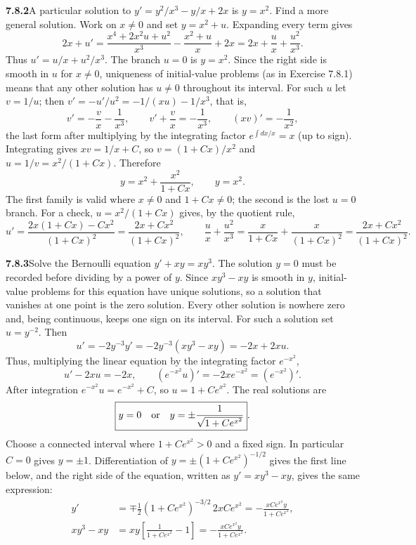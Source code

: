 \par\bigskip
\noindent\textbf{7.8.2}\quad A particular solution to
$y'=y^{2}/x^{3}-y/x+2x$ is $y=x^{2}$. Find a more general solution.
\solution
Work on $x\ne0$ and set $y=x^2+u$. Expanding every term gives
\[
2x+u'=\frac{x^4+2x^2u+u^2}{x^3}
          -\frac{x^2+u}{x}+2x
=2x+\frac ux+\frac{u^2}{x^3}.
\]
Thus $u'=u/x+u^2/x^3$. The branch $u=0$ is $y=x^2$. Since the right
side is smooth in $u$ for $x\ne0$, uniqueness of initial-value problems
(as in Exercise 7.8.1) means that any other solution has $u\ne0$
throughout its interval. For such $u$ let $v=1/u$; then
$v'=-u'/u^2=-1/(xu)-1/x^3$, that is,
\[
v'=-\frac vx-\frac1{x^3},\qquad
v'+\frac vx=-\frac1{x^3},\qquad (xv)'=-\frac1{x^2},
\]
the last form after multiplying by the integrating factor
$e^{\int dx/x}=x$ (up to sign).
Integrating gives $xv=1/x+C$, so $v=(1+Cx)/x^2$ and
$u=1/v=x^2/(1+Cx)$. Therefore
\[
\boxed{y=x^2+\frac{x^2}{1+Cx}},\qquad \boxed{y=x^2}.
\]
The first family is valid where $x\ne0$ and $1+Cx\ne0$; the second is
the lost $u=0$ branch. For a check,
$u=x^2/(1+Cx)$ gives, by the quotient rule,
\[
u'=\frac{2x(1+Cx)-Cx^2}{(1+Cx)^2}=\frac{2x+Cx^2}{(1+Cx)^2},\qquad
\frac ux+\frac{u^2}{x^3}=\frac x{1+Cx}+\frac x{(1+Cx)^2}
=\frac{2x+Cx^2}{(1+Cx)^2}.
\]

\par\bigskip
\noindent\textbf{7.8.3}\quad Solve the Bernoulli equation $y'+xy=xy^{3}$.
\solution
The solution $y=0$ must be recorded before dividing by a power of $y$.
Since $xy^3-xy$ is smooth in $y$, initial-value problems for this
equation have unique solutions, so a solution that vanishes at one
point is the zero solution. Every other solution is nowhere zero and,
being continuous, keeps one sign on its interval. For such a solution
set $u=y^{-2}$. Then
\[
u'=-2y^{-3}y'=-2y^{-3}(xy^3-xy)=-2x+2xu.
\]
Thus, multiplying the linear equation by the integrating factor
$e^{-x^2}$,
\[
u'-2xu=-2x,\qquad (e^{-x^2}u)'=-2xe^{-x^2}=(e^{-x^2})'.
\]
After integration $e^{-x^2}u=e^{-x^2}+C$, so $u=1+Ce^{x^2}$.
The real solutions are
\[
\boxed{y=0\quad\hbox{or}\quad
 y=\pm\frac1{\sqrt{1+Ce^{x^2}}}}.
\]
 Choose a connected interval
where $1+Ce^{x^2}>0$ and a fixed sign. In particular $C=0$ gives
$y=\pm1$. Differentiation of $y=\pm(1+Ce^{x^2})^{-1/2}$ gives the
first line below, and the right side of the equation, written as
$y'=xy^3-xy$, gives the same expression:
\[
\begin{aligned}
y'&=\mp\tfrac12(1+Ce^{x^2})^{-3/2}\,2xCe^{x^2}
=-\frac{xCe^{x^2}y}{1+Ce^{x^2}},\\
xy^3-xy&=xy\left[\frac1{1+Ce^{x^2}}-1\right]
=-\frac{xCe^{x^2}y}{1+Ce^{x^2}}.
\end{aligned}
\]

